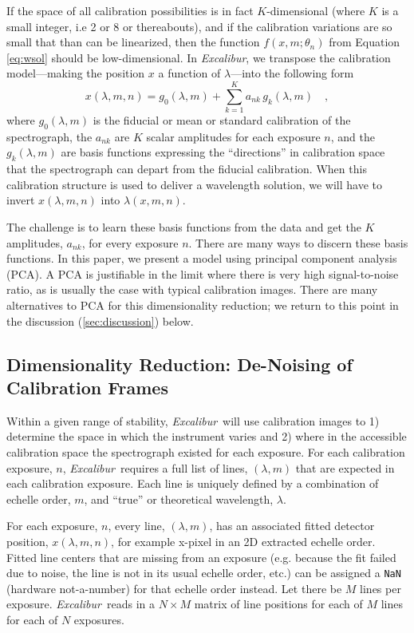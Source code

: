 \documentclass[12pt, onecolumn]{aastex63}
\newcommand{\project}[1]{\textsl{#1}}
\newcommand{\name}{\project{Excalibur}}
\newcommand{\code}[1]{\texttt{#1}}
\begin{document}
If the space of all calibration possibilities is in fact $K$-dimensional (where $K$ is a small integer, i.e 2 or 8 or thereabouts), and if the calibration variations are so small that than can be linearized, then the function $f(x,m;\theta_{n})$ from Equation \ref{eq:wsol} should be low-dimensional.  In \name, we transpose the calibration model---making the position $x$ a function of $\lambda$---into the following form
\begin{equation}
x(\lambda,m,n) = g_0(\lambda,m) + \sum_{k=1}^K a_{nk}\,g_k(\lambda,m)
\quad ,
\label{eq:excl_wsol}
\end{equation}
where
$g_0(\lambda,m)$ is the fiducial or mean or standard calibration of the spectrograph,
the $a_{nk}$ are $K$ scalar amplitudes for each exposure $n$,
and the $g_k(\lambda,m)$ are basis functions expressing the ``directions'' in calibration space that the spectrograph can depart from the fiducial calibration.  When this calibration structure is used to deliver a wavelength solution, we will have to invert $x(\lambda,m,n)$ into $\lambda(x,m,n)$.

The challenge is to learn these basis functions from the data and get the $K$ amplitudes, $a_{nk}$, for every exposure $n$.  There are many ways to discern these basis functions.  In this paper, we present a model using principal component analysis (PCA).  A PCA is justifiable in the limit where there is very high signal-to-noise ratio, as is usually the case with typical calibration images.  There are many alternatives to PCA for this dimensionality reduction; we return to this point in the discussion (\textsection \ref{sec:discussion}) below.

\subsection{Dimensionality Reduction: De-Noising of Calibration Frames} \label{sec:denoising}
Within a given range of stability, \name\ will use calibration images to  1) determine the space in which the instrument varies and 2) where in the accessible calibration space the spectrograph existed for each exposure.  For each calibration exposure, $n$, \name\ requires a full list of lines, $(\lambda,m)$ that are expected in each calibration exposure.  Each line is uniquely defined by a combination of echelle order, $m$, and ``true'' or theoretical wavelength, $\lambda$. 

For each exposure, $n$, every line, $(\lambda,m)$, has an associated fitted detector position, $x(\lambda,m,n)$, for example x-pixel in an 2D extracted echelle order.  Fitted line centers that are missing from an exposure (e.g. because the fit failed due to noise, the line is not in its usual echelle order, etc.) can be assigned a \code{NaN} (hardware not-a-number) for that echelle order instead.  Let there be $M$ lines per exposure.  \name\ reads in a $N \times M$ matrix of line positions for each of $M$ lines for each of $N$ exposures.
\end{document}
